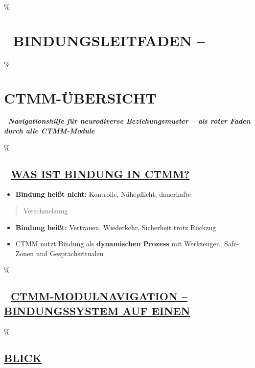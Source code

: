 \hypertarget{bindungsleitfaden}{\%
\section{\texorpdfstring{\textbf{🏥 BINDUNGSLEITFADEN --}}{🏥 BINDUNGSLEITFADEN --}}\label{bindungsleitfaden}}

\hypertarget{ctmm-uxfcbersicht}{\%
\section{\texorpdfstring{\textbf{CTMM-ÜBERSICHT}}{CTMM-ÜBERSICHT}}\label{ctmm-uxfcbersicht}}

🧩 \emph{\textbf{Navigationshilfe für neurodiverse Beziehungsmuster -- als roter Faden durch alle CTMM-Module}}

\hypertarget{was-ist-bindung-in-ctmm}{\%
\subsection{\texorpdfstring{\textbf{📘 \ul{WAS IST BINDUNG IN CTMM?}}}{📘 WAS IST BINDUNG IN CTMM?}}\label{was-ist-bindung-in-ctmm}}

\begin{itemize}
\tightlist
\item
  \textbf{Bindung heißt nicht:} Kontrolle, Nähepflicht, dauerhafte
\end{itemize}

\begin{quote}
Verschmelzung
\end{quote}

\begin{itemize}
\tightlist
\item
  \textbf{Bindung heißt:} Vertrauen, Wiederkehr, Sicherheit trotz Rückzug
\item
  CTMM nutzt Bindung als \textbf{dynamischen Prozess} mit Werkzeugen, Safe-Zonen und Gesprächsritualen
\end{itemize}

\hypertarget{ctmm-modulnavigation-bindungssystem-auf-einen}{\%
\subsection{\texorpdfstring{\textbf{🧭 \ul{CTMM-MODULNAVIGATION -- BINDUNGSSYSTEM AUF EINEN}}}{🧭 CTMM-MODULNAVIGATION -- BINDUNGSSYSTEM AUF EINEN}}\label{ctmm-modulnavigation-bindungssystem-auf-einen}}

\hypertarget{blick}{\%
\subsection{\texorpdfstring{ \textbf{\ul{BLICK}}}{ BLICK}}\label{blick}}

